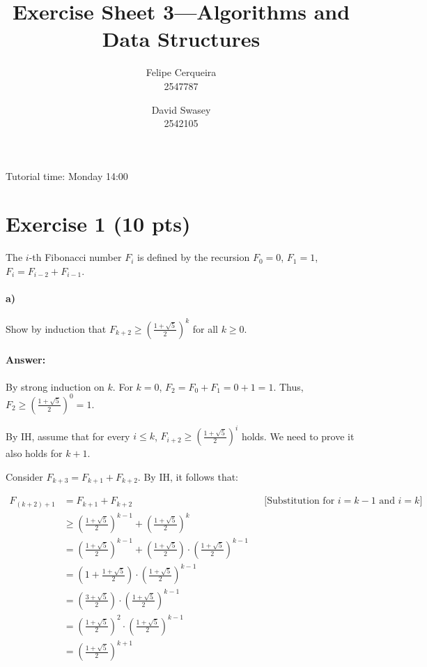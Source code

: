 \documentclass[a4paper]{article}
\title{Exercise Sheet 3---Algorithms and Data Structures}
\author{Felipe Cerqueira \\ 2547787 \and David Swasey \\ 2542105}
\begin{document}
\maketitle

Tutorial time: Monday 14:00

\section{Exercise 1 (10 pts)}

The $i$-th Fibonacci number $F_i$ is defined by the recursion $F_0 = 0$, $F_1 = 1$, $F_i = F_{i-2} + F_{i-1}$.

\paragraph{a)} Show by induction that $F_{k+2} \ge \left ( \frac{1 + \sqrt{5}}{2} \right )^k$ for all $k \ge 0$.

\paragraph{Answer:}

By strong induction on $k$. For $k=0$, $F_{2} = F_0 + F_1 = 0 + 1 = 1$. Thus, $F_2 \ge \left ( \frac{1 + \sqrt{5}}{2} \right )^0 = 1$.

By IH, assume that for every $i \le k$, $F_{i+2} \ge \left ( \frac{1 + \sqrt{5}}{2} \right )^i$ holds. We need to prove it also holds for $k+1$.

Consider $F_{k+3} = F_{k+1} + F_{k+2}$. By IH, it follows that:

\begin{align*}
F_{(k+2) + 1} & = F_{k+1} + F_{k+2} && \text{[Substitution for $i=k-1$ and $i=k$]} \\
& \ge \left ( \frac{1 + \sqrt{5}}{2} \right )^{k-1} + \left ( \frac{1 + \sqrt{5}}{2} \right )^{k} \\
& = \left ( \frac{1 + \sqrt{5}}{2} \right )^{k-1} + \left ( \frac{1 + \sqrt{5}}{2} \right ) \cdot \left ( \frac{1 + \sqrt{5}}{2} \right )^{k-1} \\
& = \left (1 + \frac{1 + \sqrt{5}}{2} \right ) \cdot \left ( \frac{1 + \sqrt{5}}{2} \right )^{k-1} \\
& = \left ( \frac{3 + \sqrt{5}}{2} \right ) \cdot \left ( \frac{1 + \sqrt{5}}{2} \right )^{k-1} \\
& = \left ( \frac{1 + \sqrt{5}}{2} \right )^{2} \cdot \left ( \frac{1 + \sqrt{5}}{2} \right )^{k-1} \\
& = \left ( \frac{1 + \sqrt{5}}{2} \right )^{k+1}
\end{align*}
\end{document}
